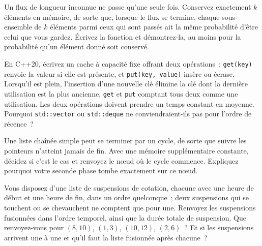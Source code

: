 \begin{question}\label{iq:iv3:algorithms:23}
Un flux de longueur inconnue ne passe qu'une seule fois. Conservez exactement $k$ éléments en mémoire, de sorte que, lorsque le flux se termine, chaque sous-ensemble de $k$ éléments parmi ceux qui sont passés ait la même probabilité d'être celui que vous gardez. Écrivez la fonction et démontrez-la, au moins pour la probabilité qu'un élément donné soit conservé.
\end{question}

\begin{question}\label{iq:iv3:algorithms:24}
En C++20, écrivez un cache à capacité fixe offrant deux opérations~: \texttt{get(key)} renvoie la valeur si elle est présente, et \texttt{put(key, value)} insère ou écrase. Lorsqu'il est plein, l'insertion d'une nouvelle clé élimine la clé dont la dernière utilisation est la plus ancienne, \texttt{get} et \texttt{put} comptant tous deux comme une utilisation. Les deux opérations doivent prendre un temps constant en moyenne. Pourquoi \texttt{std::vector} ou \texttt{std::deque} ne conviendraient-ils pas pour l'ordre de récence~?
\end{question}

\begin{question}\label{iq:iv3:algorithms:25}
Une liste chaînée simple peut se terminer par un cycle, de sorte que suivre les pointeurs n'atteint jamais de fin. Avec une mémoire supplémentaire constante, décidez si c'est le cas et renvoyez le nœud où le cycle commence. Expliquez pourquoi votre seconde phase tombe exactement sur ce nœud.
\end{question}

\begin{question}\label{iq:iv3:algorithms:26}
Vous disposez d'une liste de suspensions de cotation, chacune avec une heure de début et une heure de fin, dans un ordre quelconque~; deux suspensions qui se touchent ou se chevauchent ne comptent que pour une. Renvoyez les suspensions fusionnées dans l'ordre temporel, ainsi que la durée totale de suspension. Que renvoyez-vous pour $(8, 10)$, $(1, 3)$, $(10, 12)$, $(2, 6)$~? Et si les suspensions arrivent une à une et qu'il faut la liste fusionnée après chacune~?
\end{question}

